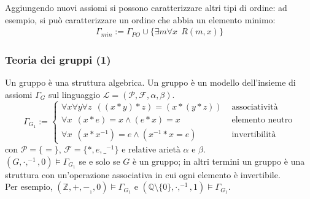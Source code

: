 Aggiungendo nuovi assiomi si possono caratterizzare altri tipi di ordine: ad esempio, si può caratterizzare un ordine che abbia un elemento minimo:
\begin{align*}
  \Gamma_{min} := \Gamma_{PO} \cup \{\exists m \forall x ~~ R(m, x)\}
\end{align*}

\subsubsection{Teoria dei gruppi (1)}
Un gruppo è una struttura algebrica. 
Un gruppo è un modello dell'insieme di assiomi $\Gamma_G$ sul linguaggio $\mathscr{L} = (\mathscr{P}, \mathscr{F}, \alpha, \beta)$. 
$$
\Gamma_{G_1} := 
  \begin{cases}
    \forall x \forall y \forall z  ~~ ((x * y)*z) = (x*(y*z))  & \text{ associatività}\\
    \forall x ~~ (x * e) = x \land (e * x) = x  & \text{ elemento neutro}\\
    \forall x ~~ (x * x^{-1}) = e \land (x^{-1} * x = e) & \text{ invertibilità}
  \end{cases}
$$
con $\mathscr{P} = \{ = \}$, $\mathscr{F} = \{*, e, \_^{-1}\}$ e relative arietà $\alpha$ e $\beta$. \\
$(G, \cdot, ^{-1}, 0) \models \Gamma_{G_1}$ se e solo se $G$ è un gruppo; in altri termini un gruppo è una struttura con un'operazione associativa in cui ogni elemento è invertibile. \\
Per esempio, $(\mathbb{Z}, +, -_{_1}, 0) \models \Gamma_{G_1}$ e $(\mathbb{Q}\setminus{\{0\}}, \cdot, ^{-1}, 1) \models \Gamma_{G_1}$. 

